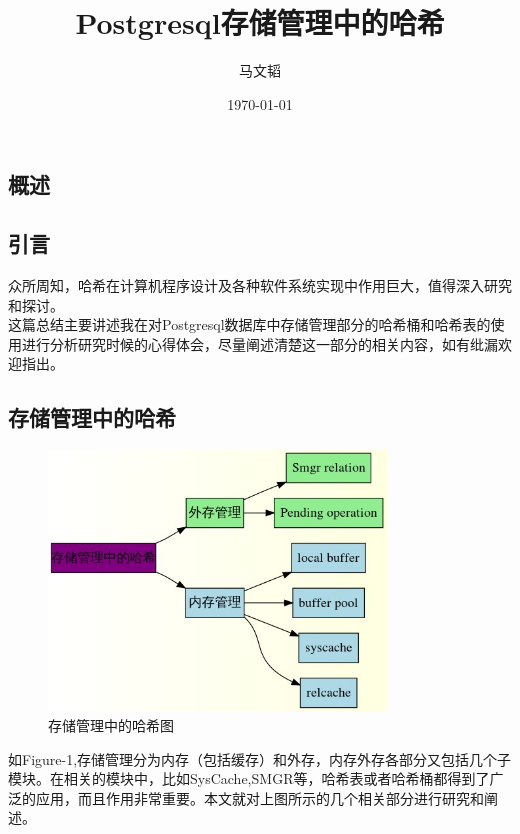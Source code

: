 \documentclass{article}
\title{Postgresql存储管理中的哈希} %
\author{马文韬} %
\date{\today} %
\begin{document}
\begin{CJK*}{UTF8}{gkai}

\maketitle %

\section{概述}
\subsection{引言}
\indent 众所周知，哈希在计算机程序设计及各种软件系统实现中作用巨大，值得深入研究和探讨。\\
\indent 这篇总结主要讲述我在对Postgresql数据库中存储管理部分的哈希桶和哈希表的使用进行分析研究时候的心得体会，尽量阐述清楚这一部分的相关内容，如有纰漏欢迎指出。
\subsection{存储管理中的哈希}
\begin{figure}[H]
\centering
\includegraphics[width = 0.8\textwidth]{index.jpg}
\caption{存储管理中的哈希图}
\label{overflow}
\end{figure}
\indent 如Figure-1,存储管理分为内存（包括缓存）和外存，内存外存各部分又包括几个子模块。在相关的模块中，比如SysCache,SMGR等，哈希表或者哈希桶都得到了广泛的应用，而且作用非常重要。本文就对上图所示的几个相关部分进行研究和阐述。











\end{CJK*}
\end{document}
